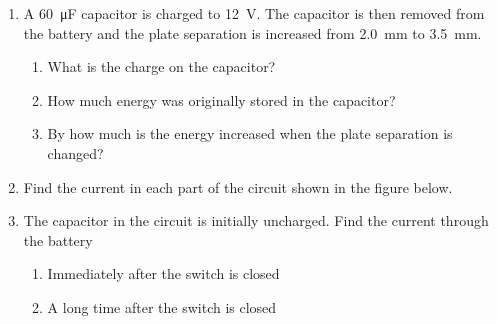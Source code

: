 \documentclass[11pt]{article}
\begin{document}
\begin{enumerate}[leftmargin=15pt]

\item A \SI{60}{\micro\farad} capacitor is charged to \SI{12}{\volt}. The
  capacitor is then removed from the battery and the plate separation is
  increased from \SI{2.0}{mm} to \SI{3.5}{mm}.
  \begin{enumerate}[noitemsep]
  \item What is the charge on the capacitor?
  \item How much energy was originally stored in the capacitor?
  \item By how much is the energy increased when the plate separation is
    changed?
  \end{enumerate}
  \newpage

\item Find the current in each part of the circuit shown in the figure below.
  \begin{center}
  \end{center}
  \newpage
  
\item The capacitor in the circuit is initially uncharged. Find the current
  through the battery
  \begin{enumerate}[noitemsep]
  \item Immediately after the switch is closed
  \item A long time after the switch is closed 
  \end{enumerate}

  \begin{center}
  \end{center}


\end{enumerate}
\end{document}
